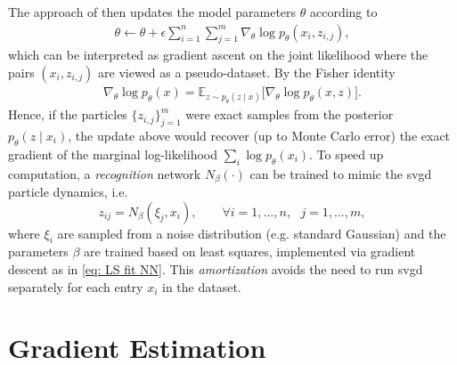 \documentclass[12pt,paper=letter]{scrreprt}
\begin{document}
The approach of \citet{feng2017learning} then updates the model parameters $\theta$ according to
\begin{align*}
    \theta \gets \theta + \epsilon \sum_{i=1}^n \sum_{j=1}^m\nabla_\theta \log p_\theta(x_i,z_{i,j}) ,
\end{align*}
which can be interpreted as gradient ascent on the joint likelihood where the pairs $(x_i,z_{i,j})$ are viewed as a pseudo-dataset.
By the Fisher identity
\begin{align*}
\nabla_\theta \log p_\theta(x)
= \mathbb{E}_{z \sim p_\theta(z \mid x)}
\big[ \nabla_\theta \log p_\theta(x,z) \big].
\end{align*}
Hence, if the particles \(\{z_{i,j}\}_{j=1}^m\) were exact samples from the posterior
\(p_\theta(z \mid x_i)\), the update above would recover (up to Monte Carlo error) the exact gradient of the marginal log-likelihood \(\sum_i \log p_\theta(x_i)\).
To speed up computation, a \emph{recognition} network $N_\beta(\cdot)$ can be trained to mimic the \ac{svgd} particle dynamics, i.e.
$$
z_{ij} = N_\beta(\xi_j, x_i), \qquad \forall i = 1,\dots,n,~~~ j = 1,\dots, m, 
$$
where $\xi_i$ are sampled from a noise distribution (e.g. standard Gaussian) and the parameters $\beta$ are trained based on least squares, implemented via gradient descent as in \eqref{eq: LS fit NN}.
This \emph{amortization} avoids the need to run \ac{svgd} separately for each entry $x_i$ in the dataset.








\section{Gradient Estimation}
\label{sec: gradient est}
\end{document}
